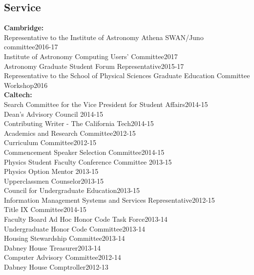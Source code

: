 \documentclass[line, margin]{res3address}
\begin{document}
\begin{resume}
\section{Service}
\textbf{Cambridge:} \\
\noindent
Representative to the Institute of Astronomy Athena SWAN/Juno committee\hfill 2016-17\\
Institute of Astronomy Computing Users' Committee\hfill 2017\\
Astronomy Graduate Student Forum Representative\hfill 2015-17\\
Representative to the School of Physical Sciences Graduate Education Committee Workshop\hfill 2016\\
\textbf{Caltech:} \\
\noindent
Search Committee for the Vice President for Student Affairs\hfill 2014-15\\
Dean's Advisory Council \hfill 2014-15\\
Contributing Writer - The California Tech\hfill 2014-15\\
Academics and Research Committee\hfill 2012-15\\
Curriculum Committee\hfill 2012-15\\
Commencement Speaker Selection Committee\hfill 2014-15\\
Physics Student Faculty Conference Committee \hfill 2013-15\\
Physics Option Mentor \hfill 2013-15\\
Upperclassmen Counselor\hfill 2013-15\\
Council for Undergraduate Education\hfill 2013-15\\
Information Management Systems and Services Representative\hfill 2012-15\\
Title IX Committee\hfill 2014-15\\
Faculty Board Ad Hoc Honor Code Task Force\hfill 2013-14\\
Undergraduate Honor Code Committee\hfill 2013-14\\
Housing Stewardship Committee\hfill 2013-14\\
Dabney House Treasurer\hfill 2013-14\\
Computer Advisory Committee\hfill 2012-14\\
Dabney House Comptroller\hfill 2012-13\\
\end{resume}
\end{document}
